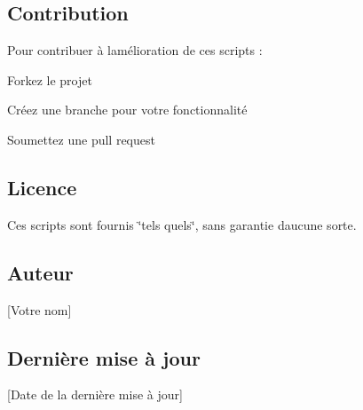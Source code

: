 \subsection*{Contribution}

Pour contribuer à l\textquotesingle{}amélioration de ces scripts \+:
\begin{DoxyEnumerate}
\item Forkez le projet
\item Créez une branche pour votre fonctionnalité
\item Soumettez une pull request
\end{DoxyEnumerate}

\subsection*{Licence}

Ces scripts sont fournis \char`\"{}tels quels\char`\"{}, sans garantie d\textquotesingle{}aucune sorte.

\subsection*{Auteur}

\mbox{[}Votre nom\mbox{]}

\subsection*{Dernière mise à jour}

\mbox{[}Date de la dernière mise à jour\mbox{]} 